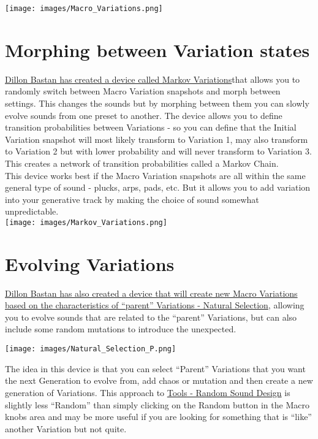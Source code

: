 \documentclass[
  12pt,
  letterpaper,
  oneside,
  open=any]{scrbook}
\begin{document}
\texttt{[image: images/Macro\_Variations.png]}

\section{Morphing between Variation
states}\label{morphing-between-variation-states}

\href{https://dillonbastan.com/store/maxforlive/index.php?product=markov-variations}{Dillon
Bastan has created a device called Markov Variations}that allows you to
randomly switch between Macro Variation snapshots and morph between
settings. This changes the sounds but by morphing between them you can
slowly evolve sounds from one preset to another. The device allows you
to define transition probabilities between Variations - so you can
define that the Initial Variation snapshot will most likely transform to
Variation 1, may also transform to Variation 2 but with lower
probability and will never transform to Variation 3. This creates a
network of transition probabilities called a Markov Chain.\\

This device works best if the Macro Variation snapshots are all within
the same general type of sound - plucks, arps, pads, etc. But it allows
you to add variation into your generative track by making the choice of
sound somewhat unpredictable.\\

\texttt{[image: images/Markov\_Variations.png]}

\section{Evolving Variations}\label{evolving-variations}

\href{https://dillonbastan.com/store/maxforlive/index.php?product=natural-selection-p}{Dillon
Bastan has also created a device that will create new Macro Variations
based on the characteristics of ``parent'' Variations - Natural
Selection}, allowing you to evolve sounds that are related to the
``parent'' Variations, but can also include some random mutations to
introduce the unexpected.

\texttt{[image: images/Natural\_Selection\_P.png]}

The idea in this device is that you can select ``Parent'' Variations
that you want the next Generation to evolve from, add chaos or mutation
and then create a new generation of Variations. This approach to
\hyperref[Chapter-024-Tool-Random_Sound_Design]{Tools - Random Sound
Design} is slightly less ``Random'' than simply clicking on the Random
button in the Macro knobs area and may be more useful if you are looking
for something that is ``like'' another Variation but not quite.
\end{document}

